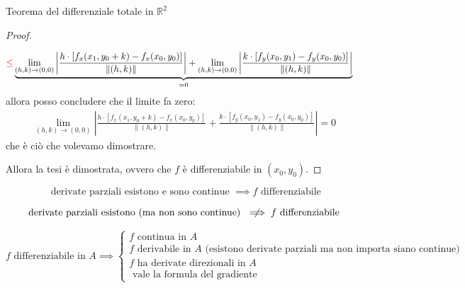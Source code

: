\documentclass{article}  %
\begin{document}
\begin{theorem}{Teorema del differenziale totale in $\mathbb{R}^2$}
\begin{proof}
\begin{enumerate}
\begin{align*}
				       & \textcolor{red}{\leq}  \underbrace{\lim_{(h,k) \to (0,0)} \left| \frac{h \cdot \left[f_x(x_1,y_0+k)-f_x(x_0,y_0)\right]}{\|(h,k)\|} \right|
					      + \lim_{(h,k) \to (0,0)} \left| \frac{k \cdot \left[f_y(x_0,y_1)-f_y(x_0,y_0)\right]}{\|(h,k)\|} \right|}_{=0}
			      \end{align*}
			      allora posso concludere che il limite fa zero:
			      \begin{align*}
				      \lim_{(h,k) \to (0,0)} \left| \frac{h \cdot \left[f_x(x_1,y_0+k)-f_x(x_0,y_0)\right]}{\|(h,k)\|}
				      + \frac{k \cdot \left[f_y(x_0,y_1)-f_y(x_0,y_0)\right]}{\|(h,k)\|} \right| = 0
			      \end{align*}
			      che è ciò che volevamo dimostrare.
		\end{enumerate}
		Allora la tesi è dimostrata, ovvero che $f$ è differenziabile in $(x_0,y_0)$.
	\end{proof}
\end{theorem}


\[
	\text{ derivate parziali esistono e sono continue } \implies f \text{ differenziabile}
\]

\[
	\text{derivate parziali esistono (ma non sono continue) } \centernot{\implies} f \text{ differenziabile}
\]

\[
	f \text{ differenziabile in } A \implies \begin{cases}
		f \text{ continua in } A                                                                      \\
		f \text{ derivabile in } A \text{ (esistono derivate parziali ma non importa siano continue)} \\
		f \text{ ha derivate direzionali in } A                                                       \\
		\text{ vale la formula del gradiente}
	\end{cases}
\]
\end{document}
